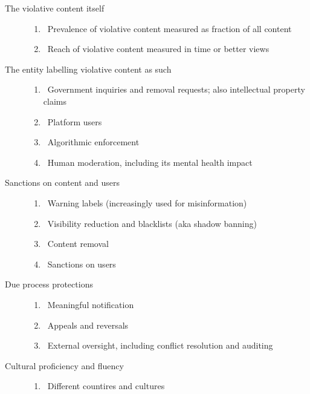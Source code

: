 
\begin{description}
\item[The violative content itself]\hfill
    \begin{enumerate}
        \item {}~Prevalence of violative content measured as fraction
            of all content
        \item {}~Reach of violative content measured in time or
            better views
    \end{enumerate}
\item[The entity labelling violative content as such]\hfill
    \begin{enumerate}[resume]
        \item {}~Government inquiries and removal requests; also
            intellectual property claims
        \item {}~Platform users
        \item {}~Algorithmic enforcement
        \item {}~Human moderation, including its mental health impact
    \end{enumerate}
\item[Sanctions on content and users]\hfill
    \begin{enumerate}[resume]
        \item {}~Warning labels (increasingly used for misinformation)
        \item {}~Visibility reduction and blacklists (aka shadow banning)
        \item {}~Content removal
        \item {}~Sanctions on users
    \end{enumerate}
\item[Due process protections]\hfill
    \begin{enumerate}[resume]
        \item {}~Meaningful notification
        \item {}~Appeals and reversals
        \item {}~External oversight, including conflict resolution and auditing
    \end{enumerate}
\item[Cultural proficiency and fluency]\hfill
    \begin{enumerate}[resume]
        \item {}~Different countires and cultures
    \end{enumerate}
\end{description}


